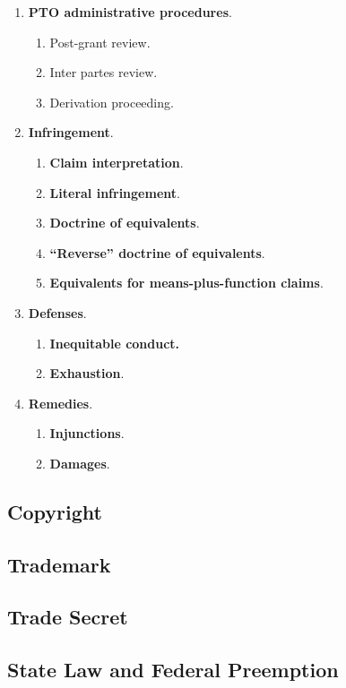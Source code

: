 \begin{enumerate}
    \item \textbf{PTO administrative procedures}.
    \begin{enumerate}
        \item Post-grant review. %
        \item Inter partes review. %
        \item Derivation proceeding. %
    \end{enumerate}
    \item \textbf{Infringement}.
    \begin{enumerate}
        \item \textbf{Claim interpretation}. %
        \item \textbf{Literal infringement}. %
        \item \textbf{Doctrine of equivalents}. %
        \item \textbf{``Reverse'' doctrine of equivalents}. %
        \item \textbf{Equivalents for means-plus-function claims}. %
    \end{enumerate}
    \item \textbf{Defenses}.
    \begin{enumerate}
        \item \textbf{Inequitable conduct.} %
        \item \textbf{Exhaustion}. %
    \end{enumerate}
    \item \textbf{Remedies}.
    \begin{enumerate}
        \item \textbf{Injunctions}. %
        \item \textbf{Damages}. %
    \end{enumerate}
\end{enumerate}

\subsection{Copyright}


\subsection{Trademark}


\subsection{Trade Secret}


\subsection{State Law and Federal Preemption}
